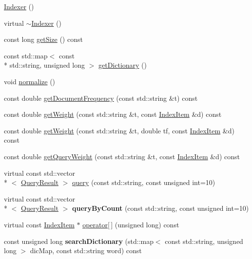 \begin{DoxyCompactItemize}
\item 
\hyperlink{classIndexer_ac4c8c21c68d62185ceddbad8781e3b67}{Indexer} ()
\item 
virtual \hyperlink{classIndexer_aaf5971639a7a2e3d9af4d8da62deb6f4}{$\sim$\-Indexer} ()
\item 
const long \hyperlink{classIndexer_a55ec44403e327e1720a834f6b7c2289d}{get\-Size} () const 
\item 
const std\-::map$<$ const \\*
std\-::string, unsigned long $>$ \hyperlink{classIndexer_a92be0b09f21160df9e927d76dfbe48d1}{get\-Dictionary} ()
\item 
void \hyperlink{classIndexer_ae090be1899c4ce1e4baeb0acfe12cdee}{normalize} ()
\item 
const double \hyperlink{classIndexer_a646d73e4daefd444e0ab1491e68e5b5e}{get\-Document\-Frequency} (const std\-::string \&t) const 
\item 
const double \hyperlink{classIndexer_ab40a5e7cf5767dea0c6e28ab12b20f60}{get\-Weight} (const std\-::string \&t, const \hyperlink{classIndexItem}{Index\-Item} \&d) const 
\item 
const double \hyperlink{classIndexer_a7eaa5c834d2ea0d87c1de65ce53c74e2}{get\-Weight} (const std\-::string \&t, double tf, const \hyperlink{classIndexItem}{Index\-Item} \&d) const 
\item 
const double \hyperlink{classIndexer_a164449012701532738e578b990fb6dab}{get\-Query\-Weight} (const std\-::string \&t, const \hyperlink{classIndexItem}{Index\-Item} \&d) const 
\item 
virtual const std\-::vector\\*
$<$ \hyperlink{classQueryResult}{Query\-Result} $>$ \hyperlink{classIndexer_abd1dd6a6da0c9e43efaa99866c538e6c}{query} (const std\-::string, const unsigned int=10)
\item 
\hypertarget{classIndexer_aafca8bb21d67052dcf665cdc714db17b}{virtual const std\-::vector\\*
$<$ \hyperlink{classQueryResult}{Query\-Result} $>$ {\bfseries query\-By\-Count} (const std\-::string, const unsigned int=10)}\label{classIndexer_aafca8bb21d67052dcf665cdc714db17b}

\item 
virtual const \hyperlink{classIndexItem}{Index\-Item} $\ast$ \hyperlink{classIndexer_a2f2530920425342d0b4f8652c7368ecd}{operator\mbox{[}$\,$\mbox{]}} (unsigned long) const 
\item 
\hypertarget{classIndexer_a115a9ee696a07c02cadf38e294ce16e4}{const unsigned long {\bfseries search\-Dictionary} (std\-::map$<$ const std\-::string, unsigned long $>$ dic\-Map, const std\-::string word) const }\label{classIndexer_a115a9ee696a07c02cadf38e294ce16e4}

\end{DoxyCompactItemize}
